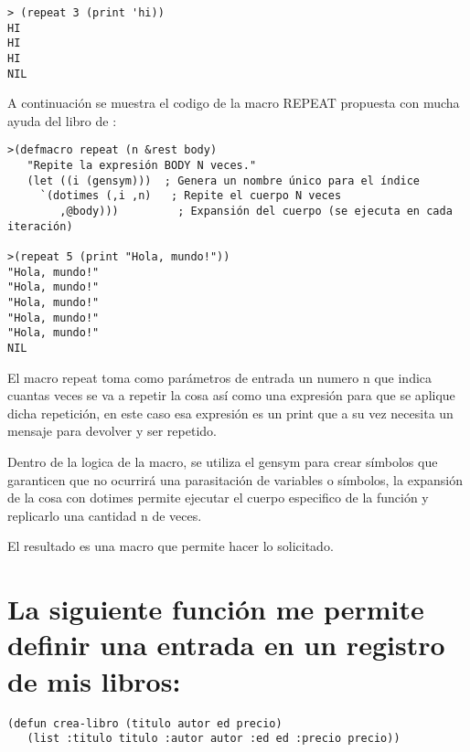 \documentclass[11pt, letterpaper]{article}
\begin{document}
\begin{itemize}
	\begin{verbatim}
> (repeat 3 (print 'hi))
HI
HI
HI
NIL
	\end{verbatim}
\end{itemize}

A continuación se muestra el codigo de la macro REPEAT propuesta con mucha ayuda del libro de \cite{seibel2006}:

\begin{itemize}
	\begin{verbatim}
>(defmacro repeat (n &rest body)
   "Repite la expresión BODY N veces."
   (let ((i (gensym)))  ; Genera un nombre único para el índice
     `(dotimes (,i ,n)   ; Repite el cuerpo N veces
        ,@body)))         ; Expansión del cuerpo (se ejecuta en cada iteración)

>(repeat 5 (print "Hola, mundo!"))
"Hola, mundo!" 
"Hola, mundo!" 
"Hola, mundo!" 
"Hola, mundo!" 
"Hola, mundo!" 
NIL
	\end{verbatim}
\end{itemize}

El macro repeat toma como parámetros de entrada un numero n que indica cuantas veces se va a repetir la cosa así como una expresión para que se aplique dicha repetición, en este caso esa expresión es un print que a su vez necesita un mensaje para devolver y ser repetido.

Dentro de la logica de la macro, se utiliza el gensym para crear símbolos que garanticen que no ocurrirá una parasitación de variables o símbolos, la expansión de la cosa con dotimes permite ejecutar el cuerpo especifico de la función y replicarlo una cantidad n de veces.

El resultado es una macro que permite hacer lo solicitado.



\newpage

\section{La siguiente función me permite definir una entrada en un registro de mis libros:}

\begin{itemize}
	\begin{verbatim}
(defun crea-libro (titulo autor ed precio)
   (list :titulo titulo :autor autor :ed ed :precio precio))
	\end{verbatim}
\end{itemize}
\end{document}
